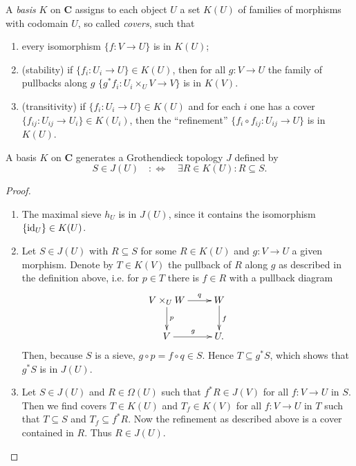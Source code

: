 \documentclass{notes}
\def\C{\mathbf{C}}
\def\id{\textup{id}}
\begin{document}
{	\begin{definition}
		A \emph{basis} $K$ on $\C$ assigns to each object $U$ a set $K(U)$ of families of morphisms with codomain $U$, so called \emph{covers}, such that
		\begin{enumerate}
			\item every isomorphism $\{f : V \rightarrow U\}$ is in $K(U)$;
			\item (stability) if $\{f_i : U_i \rightarrow U\} \in K(U)$, then for all $g : V \rightarrow U$ the family of pullbacks along $g$ $\{g^*f_i : U_i \times_U V \rightarrow V\}$
			is in $K(V)$.
			\item (transitivity) if $\{f_i : U_i \rightarrow U\} \in K(U)$ and for each $i$ one has a cover $\{f_{ij} : U_{ij} \rightarrow U_i\} \in K(U_i)$, then the ``refinement'' $\{f_i \circ f_{ij} : U_{ij} \rightarrow U\}$ is in $K(U)$.
		\end{enumerate}
	\end{definition}
	
	\begin{prop}
		A basis $K$ on $\C$ generates a Grothendieck topology $J$ defined by
		\begin{equation*}
			S \in J(U) \quad : \Longleftrightarrow \quad \exists R \in K(U) : R \subseteq S.
		\end{equation*}
	\end{prop}
	
	\begin{proof}
		\begin{enumerate}
			\item The maximal sieve $h_U$ is in $J(U)$, since it contains the isomorphism $\{\id_U\} \in K(U)$.
			\item Let $S \in J(U)$ with $R \subseteq S$ for some $R \in K(U)$ and $g : V \rightarrow U$ a given morphism.
			Denote by $T \in K(V)$ the pullback of $R$ along $g$ as described in the definition above,
			i.e. for $p \in T$ there is $f \in R$ with a pullback diagram
			$$
			\xymatrix{
				V \times_U W \ar[d]^-p \ar[r]^-q & W \ar[d]^f \\
				V \ar[r]^g & U.
			}
			$$
			Then, because $S$ is a sieve, $g \circ p = f \circ q \in S$.
			Hence $T \subseteq g^*S$, which shows that $g^*S$ is in $J(U)$.
			\item Let $S \in J(U)$ and $R \in \Omega(U)$ such that $f^*R \in J(V)$ for all $f : V \rightarrow U$ in $S$.
			Then we find covers $T \in K(U)$ and $T_f \in K(V)$ for all $f : V \rightarrow U$ in $T$ such that $T \subseteq S$ and $T_f \subseteq f^*R$.
			Now the refinement as described above is a cover contained in $R$.
			Thus $R \in J(U)$.
		\end{enumerate}
	\end{proof}
	
}
\end{document}
